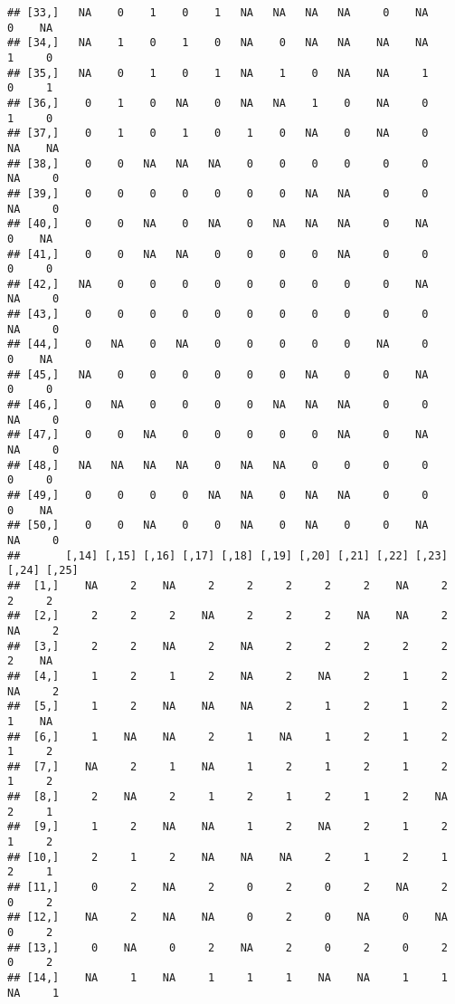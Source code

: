 \documentclass[
]{article}
\begin{document}
\begin{verbatim}
## [33,]   NA    0    1    0    1   NA   NA   NA   NA     0    NA     0    NA
## [34,]   NA    1    0    1    0   NA    0   NA   NA    NA    NA     1     0
## [35,]   NA    0    1    0    1   NA    1    0   NA    NA     1     0     1
## [36,]    0    1    0   NA    0   NA   NA    1    0    NA     0     1     0
## [37,]    0    1    0    1    0    1    0   NA    0    NA     0    NA    NA
## [38,]    0    0   NA   NA   NA    0    0    0    0     0     0    NA     0
## [39,]    0    0    0    0    0    0    0   NA   NA     0     0    NA     0
## [40,]    0    0   NA    0   NA    0   NA   NA   NA     0    NA     0    NA
## [41,]    0    0   NA   NA    0    0    0    0   NA     0     0     0     0
## [42,]   NA    0    0    0    0    0    0    0    0     0    NA    NA     0
## [43,]    0    0    0    0    0    0    0    0    0     0     0    NA     0
## [44,]    0   NA    0   NA    0    0    0    0    0    NA     0     0    NA
## [45,]   NA    0    0    0    0    0    0   NA    0     0    NA     0     0
## [46,]    0   NA    0    0    0    0   NA   NA   NA     0     0    NA     0
## [47,]    0    0   NA    0    0    0    0    0   NA     0    NA    NA     0
## [48,]   NA   NA   NA   NA    0   NA   NA    0    0     0     0     0     0
## [49,]    0    0    0    0   NA   NA    0   NA   NA     0     0     0    NA
## [50,]    0    0   NA    0    0   NA    0   NA    0     0    NA    NA     0
##       [,14] [,15] [,16] [,17] [,18] [,19] [,20] [,21] [,22] [,23] [,24] [,25]
##  [1,]    NA     2    NA     2     2     2     2     2    NA     2     2     2
##  [2,]     2     2     2    NA     2     2     2    NA    NA     2    NA     2
##  [3,]     2     2    NA     2    NA     2     2     2     2     2     2    NA
##  [4,]     1     2     1     2    NA     2    NA     2     1     2    NA     2
##  [5,]     1     2    NA    NA    NA     2     1     2     1     2     1    NA
##  [6,]     1    NA    NA     2     1    NA     1     2     1     2     1     2
##  [7,]    NA     2     1    NA     1     2     1     2     1     2     1     2
##  [8,]     2    NA     2     1     2     1     2     1     2    NA     2     1
##  [9,]     1     2    NA    NA     1     2    NA     2     1     2     1     2
## [10,]     2     1     2    NA    NA    NA     2     1     2     1     2     1
## [11,]     0     2    NA     2     0     2     0     2    NA     2     0     2
## [12,]    NA     2    NA    NA     0     2     0    NA     0    NA     0     2
## [13,]     0    NA     0     2    NA     2     0     2     0     2     0     2
## [14,]    NA     1    NA     1     1     1    NA    NA     1     1    NA     1

\end{verbatim}
\end{document}
